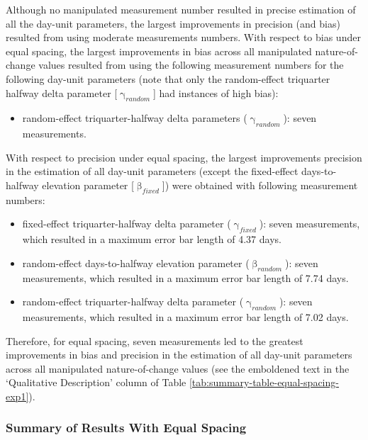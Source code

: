 \documentclass[
12pt, %
twoside,
english]{guelphthesis}
\begin{document}
Although no manipulated measurement number resulted in precise estimation of all the day-unit parameters, the largest improvements in precision (and bias) resulted from using moderate measurements numbers. With respect to bias under equal spacing, the largest improvements in bias across all manipulated nature-of-change values resulted from using the following measurement numbers for the following day-unit parameters (note that only the random-effect triquarter halfway delta parameter {[}\(\upgamma_{random}\){]} had instances of high bias):
\begin{itemize}
\tightlist
\item
  random-effect triquarter-halfway delta parameters (\(\upgamma_{random}\)): seven measurements.
\end{itemize}
\noindent With respect to precision under equal spacing, the largest improvements precision in the estimation of all day-unit parameters (except the fixed-effect days-to-halfway elevation parameter {[}\(\upbeta_{fixed}\){]}) were obtained with following measurement numbers:
\begin{itemize}
\tightlist
\item
  fixed-effect triquarter-halfway delta parameter (\(\upgamma_{fixed}\)): seven measurements, which resulted in a maximum error bar length of 4.37 days.
\item
  random-effect days-to-halfway elevation parameter (\(\upbeta_{random}\)): seven measurements, which resulted in a maximum error bar length of 7.74 days.
\item
  random-effect triquarter-halfway delta parameter (\(\upgamma_{random}\)): seven measurements, which resulted in a maximum error bar length of 7.02 days.
\end{itemize}
\noindent Therefore, for equal spacing, seven measurements led to the greatest improvements in bias and precision in the estimation of all day-unit parameters across all manipulated nature-of-change values (see the emboldened text in the `Qualitative Description' column of Table \ref{tab:summary-table-equal-spacing-exp1}).

\hypertarget{summary-of-results-with-equal-spacing}{%
\subsubsection{Summary of Results With Equal Spacing}\label{summary-of-results-with-equal-spacing}}
\end{document}
